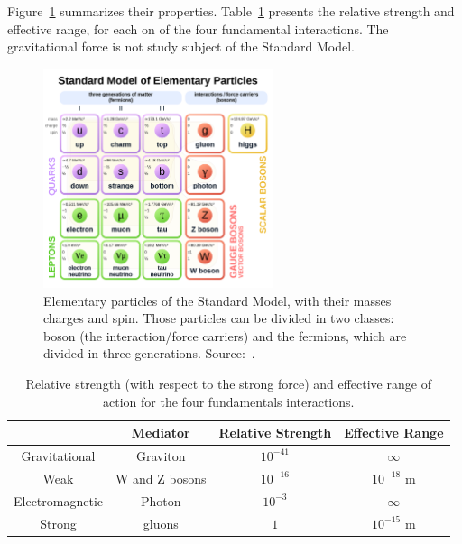 Figure~\ref{sm_summary} summarizes their properties. Table~\ref{fundamental_forces} presents the relative strength and effective range, for each on of the four fundamental interactions. The gravitational force is not study subject of the Standard Model.

\begin{figure}[!htbp]
  \begin{center}
  \includegraphics[width=0.6\textwidth ]{figures/theory/sm.png}
  \end{center}\vspace*{-.5cm}
  \caption{Elementary particles of the Standard Model, with their masses charges and spin. Those particles can be divided in two classes: boson (the interaction/force carriers) and the fermions, which are divided in three generations. Source:~\cite{fig_sm_summary}.}
  \label{sm_summary}
  \end{figure}
 

\begin{table}[htp]
  \begin{center}
      \caption{Relative strength (with respect to the strong force) and effective range of action for the four fundamentals interactions.}
    \begin{tabular}{ cccc }
       & Mediator & Relative Strength & Effective Range \\ \hline
      Gravitational & Graviton & $10^{-41}$ & $\infty$ \\ 
      Weak & W and Z bosons & $10^{-16}$ & $10^{-18}$ m \\ 
      Electromagnetic & Photon & $10^{-3}$ & $\infty$ \\ 
      Strong & gluons & $1$ & $10^{-15}$ m\\ \hline
      \end{tabular}
  \label{fundamental_forces}
  \end{center} 
  \end{table}


